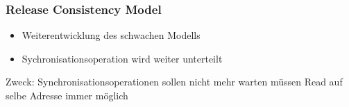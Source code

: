 \documentclass{sikslides}
\begin{document}
\begin{frame}
	\frametitle{Release Consistency Model}
	\begin{itemize}
		\item Weiterentwicklung des schwachen Modells
		\item Sychronisationsoperation wird weiter unterteilt
	\end{itemize}
	\bigskip Zweck: 
\newline Synchronisationsoperationen sollen nicht mehr warten müssen 
\newline Read auf selbe Adresse immer möglich
\end{frame}
\end{document}
